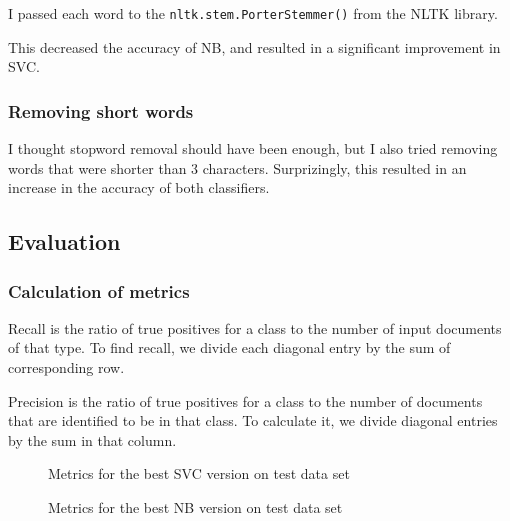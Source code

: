 I passed each word to the \texttt{nltk.stem.PorterStemmer()} from the NLTK library.

This decreased the accuracy of NB, and resulted in a significant improvement in SVC.

\subsubsection{Removing short words}
\label{sec:shortwords}

I thought stopword removal should have been enough, but I also tried removing words that were shorter than 3 characters. Surprizingly, this resulted in an increase in the accuracy of both classifiers.

\subsection{Evaluation}
\label{sec:evaluation}

\subsubsection{Calculation of metrics}
Recall is the ratio of true positives for a class to the number of input documents of that type. To find recall, we divide each diagonal entry by the sum of corresponding row.

Precision is the ratio of true positives for a class to the number of documents that are identified to be in that class. To calculate it, we divide diagonal entries by the sum in that column.

\begin{figure}[htpb]
    \caption{Metrics for the best SVC version on test data set}
    \label{fig:svc_best_metrics}
    \begin{tcolorbox}
        
    \end{tcolorbox}
\end{figure}

\begin{figure}[htpb]
    \caption{Metrics for the best NB version on test data set}
    \label{fig:bayes_best_metrics}
    \begin{tcolorbox}
        
    \end{tcolorbox}
\end{figure}
